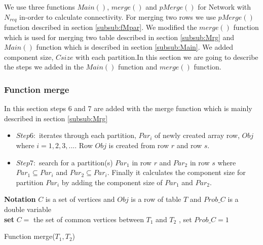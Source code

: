 \documentclass[12pt]{article}
\begin{document}
We use three functions $Main()$, $merge()$ and $pMerge()$  for Network with $N_{req}$ in-order to calculate connectivity. For merging two rows we use $pMerge()$ function described in section \ref{subsub:fMpar}. We modified the $merge()$ function which is used for merging two table described in section \ref{subsub:Mrg} and $Main()$ function which is described in section \ref{subsub:Main}. We added component size, $Csize$ with each partition.In this section we are going to describe the steps we added in the $Main()$ function and $merge()$ function.
\subsubsection{Function merge}
In this section steps 6 and 7 are added with the merge function which is mainly described in section \ref{subsub:Mrg}
\begin{itemize}[noitemsep]
\item $Step 6:$ iterates through each partition, $Par_i$ of newly created array row, $Obj$ where $i=1,2,3,...$. Row $Obj$ is created from row $r$ and row $s$.
\item $Step 7:$ search for a partition(s) $Par_1$ in row $r$ and $Par_2$ in row $s$ where $Par_1\subseteq Par_i$ and  $Par_2\subseteq Par_i$. Finally it calculates the component size for partition $Par_i$  by adding the component size of $Par_1$ and $Par_2$.
\end{itemize}

\begin{algorithm}[H]

\Indm  
{}

\textbf{Notation} $C$ is a set of vertices and $Obj$ is a row of table $T$ and $Prob\_C$ is a double variable\\
\Indp
\nl \textbf{set} $C=$ the set of common vertices between $T_1$ and $T_2$ , set $Prob\_C=1$\\
 \nl {}
\nl {}

 \caption{Function merge($T_1,T_2$)}
\end{algorithm}
\end{document}
